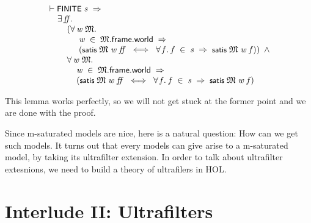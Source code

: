 \documentclass[letterpaper]{article}
\renewcommand{\HOLConst}[1]{{\textsf{\upshape\small #1}}}
\newenvironment{holmath}{\begin{displaymath}\begin{array}{l}}{\end{array}\end{displaymath}\ignorespacesafterend}
\begin{document}
\begin{holmath}
  \ensuremath{\HOLTokenTurnstile}\HOLConst{FINITE}\;\HOLFreeVar{s}\;\HOLSymConst{\HOLTokenImp{}}\\
\;\;\;\;\;\HOLSymConst{\HOLTokenExists{}}\HOLBoundVar{ff}.\\
\;\;\;\;\;\;\;\;\;(\HOLSymConst{\HOLTokenForall{}}\HOLBoundVar{w}\;\HOLBoundVar{\ensuremath{\mathfrak{M}}}.\\
\;\;\;\;\;\;\;\;\;\;\;\;\;\;\HOLBoundVar{w}\;\HOLSymConst{\HOLTokenIn{}}\;\HOLBoundVar{\ensuremath{\mathfrak{M}}}.\HOLFieldName{frame}.\HOLFieldName{world}\;\HOLSymConst{\HOLTokenImp{}}\\
\;\;\;\;\;\;\;\;\;\;\;\;\;\;(\HOLConst{satis}\;\HOLBoundVar{\ensuremath{\mathfrak{M}}}\;\HOLBoundVar{w}\;\HOLBoundVar{ff}\;\HOLSymConst{\HOLTokenEquiv{}}\;\HOLSymConst{\HOLTokenForall{}}\HOLBoundVar{f}.\;\HOLBoundVar{f}\;\HOLSymConst{\HOLTokenIn{}}\;\HOLFreeVar{s}\;\HOLSymConst{\HOLTokenImp{}}\;\HOLConst{satis}\;\HOLBoundVar{\ensuremath{\mathfrak{M}}}\;\HOLBoundVar{w}\;\HOLBoundVar{f}))\;\HOLSymConst{\HOLTokenConj{}}\\
\;\;\;\;\;\;\;\;\;\HOLSymConst{\HOLTokenForall{}}\HOLBoundVar{w}\;\HOLBoundVar{\ensuremath{\mathfrak{M}}}.\\
\;\;\;\;\;\;\;\;\;\;\;\;\;\HOLBoundVar{w}\;\HOLSymConst{\HOLTokenIn{}}\;\HOLBoundVar{\ensuremath{\mathfrak{M}}}.\HOLFieldName{frame}.\HOLFieldName{world}\;\HOLSymConst{\HOLTokenImp{}}\\
\;\;\;\;\;\;\;\;\;\;\;\;\;(\HOLConst{satis}\;\HOLBoundVar{\ensuremath{\mathfrak{M}}}\;\HOLBoundVar{w}\;\HOLBoundVar{ff}\;\HOLSymConst{\HOLTokenEquiv{}}\;\HOLSymConst{\HOLTokenForall{}}\HOLBoundVar{f}.\;\HOLBoundVar{f}\;\HOLSymConst{\HOLTokenIn{}}\;\HOLFreeVar{s}\;\HOLSymConst{\HOLTokenImp{}}\;\HOLConst{satis}\;\HOLBoundVar{\ensuremath{\mathfrak{M}}}\;\HOLBoundVar{w}\;\HOLBoundVar{f})
\end{holmath}

This lemma works perfectly, so we will not get stuck at the former point and we are done with the proof.

Since m-saturated models are nice, here is a natural question: How can we get such models. It turns out that every models can give arise to a m-saturated model, by taking its ultrafilter extension. In order to talk about ultrafilter extesnions, we need to build a theory of ultrafilers in HOL.

\section{Interlude II: Ultrafilters}
\end{document}

